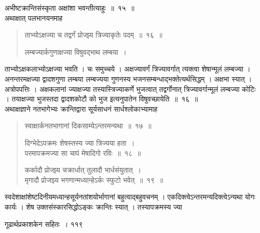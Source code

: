 \documentclass[11pt, openany]{book}
\begin{document}
अभीष्टक्रान्तिसंस्कृता अक्षांशा भवन्तीत्याहुः~॥~१५~॥\\
अथाक्षात् पलभानयनमाह\textendash
\begin{quote}

{\ssi ताभ्योऽक्षज्या च तद्वर्गं प्रोज्झ्य त्रिज्याकृतेः पदम्~॥~१६~॥

लम्बज्यार्कगुणाक्षज्या विषुवद्भाथ लम्बया~।}
\end{quote}
\begin{sloppypar}
 ताभ्योऽक्षकलाभ्योऽक्षज्या भवति । चः समुच्चये । अक्षज्यावर्गं त्रिज्यावर्गात् त्यक्त्वा शेषान्मूलं लम्बज्या । अनन्तरमक्षज्या द्वादशगुणा लम्बया लम्बज्यया गुणनस्य भजनसम्बन्धाद्भक्तेत्यर्थसिद्धम् । अक्षभा स्यात् । अत्रोपपत्तिः । अक्षकलानां ज्याक्षज्या तस्यास्त्रिज्याकर्णे भुजत्वात् तद्वर्गोनात् त्रिज्यावर्गान्मूलं लम्बज्या कोटिः । तयाक्षज्या भुजस्तदा द्वादशकोटौ को भुज इत्यनुपातेन विषुवच्छायेति~॥~१६~॥\\
\noindent अथाक्षज्ञाने नतभागेभ्यः क्रान्तिद्वारा सूर्यसाधनं सार्धश्लोकाभ्यामाह\textendash
\end{sloppypar}
\begin{quote}

  {\ssi स्वाक्षार्कनतभागानां दिकसाम्येऽन्तरमन्यथा~॥~१७~॥
  
दिग्भेदेऽपक्रमः शेषस्तस्य ज्या त्रिज्यया हता~।\\
परमापक्रमज्या सा चापं मेषादिगो रविः~॥~१८~॥

कर्कादौ प्रोज्झ्य चक्रार्धात् तुलादौ भार्धसंयुतात्~।\\
मृगादौ प्रोजझ्य भगणान्मध्यान्हेऽर्कः स्फुटो भवेत्~॥~१९~॥}
\end{quote}
\begin{sloppypar}
 स्वदेशाक्षांशेष्टदिनीयमध्यान्हसूर्यनतांशयोर्भागानां बहुत्वाद्बहुवचनम् । एकदिक्त्वेऽन्तरमन्यदिक्त्वेऽन्यथा योगः कार्यः । शेष उक्तसंस्कारसिद्धोऽङ्कः क्रान्तिः स्यात् । तस्यापक्रमस्य ज्या
\end{sloppypar}

\newpage


\hspace{3cm} गूढार्थप्रकाशकेन सहितः~। \hfill ११९
\vspace{1cm}
\end{document}
